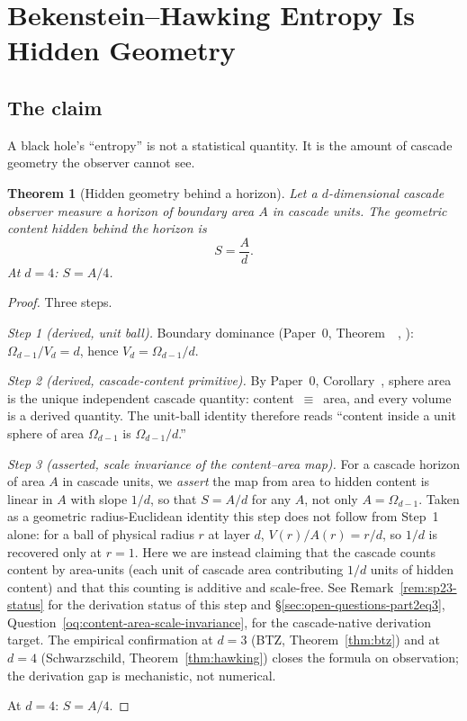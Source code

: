 \documentclass[12pt,a4paper]{article}
\newtheorem{theorem}{Theorem}[section]
\begin{document}
\section{Bekenstein--Hawking Entropy Is Hidden Geometry}\label{sec:bekenstein-hawking-entropy-is-hidden-geo}

\subsection{The claim}

A black hole's ``entropy'' is not a statistical quantity. It is the amount of
cascade geometry the observer cannot see.

\begin{theorem}[Hidden geometry behind a horizon]\label{thm:bh}
Let a $d$-dimensional cascade observer measure a horizon of boundary area $A$
in cascade units. The geometric content hidden behind the horizon is
\[
\boxed{\;S = \frac{A}{d}.\;}
\]
At $d = 4$: $S = A/4$.
\end{theorem}

\begin{proof}
Three steps.

\emph{Step 1 (derived, unit ball).} Boundary dominance
(Paper~0, Theorem~~\cite{part0}, ):
$\Omega_{d-1}/V_d = d$, hence $V_d = \Omega_{d-1}/d$.

\emph{Step 2 (derived, cascade-content primitive).} By Paper~0, Corollary~, sphere area is the unique independent
cascade quantity: content~$\equiv$~area, and every volume is a derived
quantity. The unit-ball identity therefore reads
``content inside a unit sphere of area $\Omega_{d-1}$ is $\Omega_{d-1}/d$.''

\emph{Step 3 (asserted, scale invariance of the content--area map).}
For a cascade horizon of area $A$ in cascade units, we \emph{assert} the
map from area to hidden content is linear in $A$ with slope $1/d$, so that
$S = A/d$ for any $A$, not only $A = \Omega_{d-1}$. Taken as a
geometric radius-Euclidean identity this step does not follow from Step~1
alone: for a ball of physical radius $r$ at layer $d$, $V(r)/A(r) = r/d$,
so $1/d$ is recovered only at $r=1$. Here we are instead claiming that the
cascade counts content by area-units (each unit of cascade area contributing
$1/d$ units of hidden content) and that this counting is additive and
scale-free. See Remark~\ref{rem:sp23-status} for the derivation status of
this step and §\ref{sec:open-questions-part2eq3},
Question~\ref{oq:content-area-scale-invariance}, for the cascade-native
derivation target. The empirical confirmation at $d=3$ (BTZ,
Theorem~\ref{thm:btz}) and at $d=4$ (Schwarzschild, Theorem~\ref{thm:hawking})
closes the formula on observation; the derivation gap is mechanistic, not
numerical.

At $d = 4$: $S = A/4$.
\end{proof}
\end{document}
